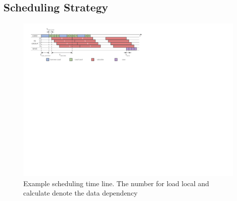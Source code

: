 \subsection{Scheduling Strategy}

\begin{figure}[t]
  \centering
  \includegraphics[width=1.8\columnwidth]{figures/schedule.pdf}
  \caption{Example scheduling time line. The number for load local and calculate denote the data dependency}
  \label{fig:sch}
\end{figure}

